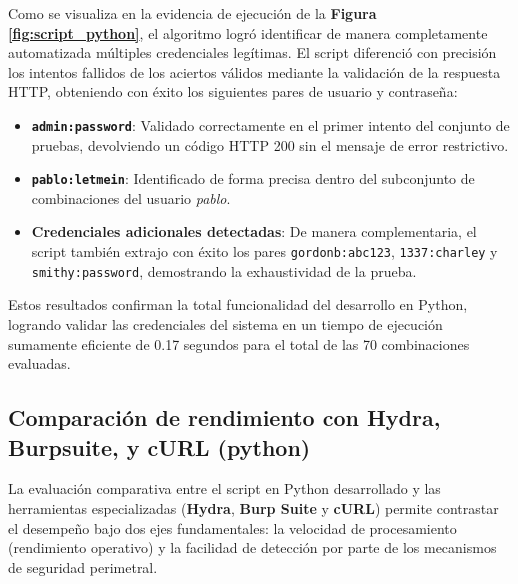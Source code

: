 \documentclass[letter,12pt]{article}
\begin{document}
Como se visualiza en la evidencia de ejecución de la \textbf{Figura \ref{fig:script_python}}, el algoritmo logró identificar de manera completamente automatizada múltiples credenciales legítimas. El script diferenció con precisión los intentos fallidos de los aciertos válidos mediante la validación de la respuesta HTTP, obteniendo con éxito los siguientes pares de usuario y contraseña:

\begin{itemize}
    \item \textbf{\texttt{admin:password}}: Validado correctamente en el primer intento del conjunto de pruebas, devolviendo un código HTTP 200 sin el mensaje de error restrictivo.
    \item \textbf{\texttt{pablo:letmein}}: Identificado de forma precisa dentro del subconjunto de combinaciones del usuario \textit{pablo}.
    \item \textbf{Credenciales adicionales detectadas}: De manera complementaria, el script también extrajo con éxito los pares \texttt{gordonb:abc123}, \texttt{1337:charley} y \texttt{smithy:password}, demostrando la exhaustividad de la prueba.
\end{itemize}

Estos resultados confirman la total funcionalidad del desarrollo en Python, logrando validar las credenciales del sistema en un tiempo de ejecución sumamente eficiente de 0.17 segundos para el total de las 70 combinaciones evaluadas.

\subsection{Comparación de rendimiento con Hydra, Burpsuite, y cURL (python)}

La evaluación comparativa entre el script en Python desarrollado y las herramientas especializadas (\textbf{Hydra}, \textbf{Burp Suite} y \textbf{cURL}) permite contrastar el desempeño bajo dos ejes fundamentales: la velocidad de procesamiento (rendimiento operativo) y la facilidad de detección por parte de los mecanismos de seguridad perimetral.
\end{document}
